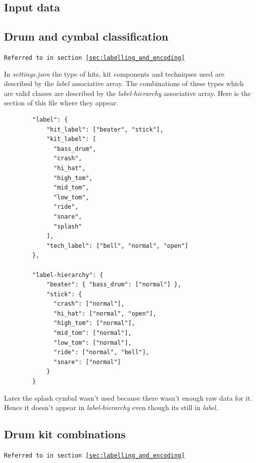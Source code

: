 \begin{appendices}
    \section{Input data}
        \subsection{Drum and cymbal classification}
        \label{app:classification}
        \texttt{Referred to in section \ref{sec:labelling_and_encoding}}\smallskip
        
        In \textit{settings.json} the type of hits, kit components and techniques used are described by the \textit{label} associative array. The combinations of these types which are valid classes are described by the  \textit{label-hierarchy} associative array. Here is the section of this file where they appear:
        
        \begin{lstlisting}
        "label": {
            "hit_label": ["beater", "stick"],
            "kit_label": [
              "bass_drum",
              "crash",
              "hi_hat",
              "high_tom",
              "mid_tom",
              "low_tom",
              "ride",
              "snare",
              "splash"
            ],
            "tech_label": ["bell", "normal", "open"]
        },
          
        "label-hierarchy": {
            "beater": { "bass_drum": ["normal"] },
            "stick": {
              "crash": ["normal"],
              "hi_hat": ["normal", "open"],
              "high_tom": ["normal"],
              "mid_tom": ["normal"],
              "low_tom": ["normal"],
              "ride": ["normal", "bell"],
              "snare": ["normal"]
            }
        }
        \end{lstlisting}
        
        Later the splash cymbal wasn't used because there wasn't enough raw data for it. Hence it doesn't appear in \textit{label-hierarchy} even though its still in \textit{label}.
        
        \newpage
        \subsection{Drum kit combinations}
        \label{app:kit-combinations}
        \texttt{Referred to in section \ref{sec:labelling_and_encoding}}\smallskip
        

\end{appendices}
